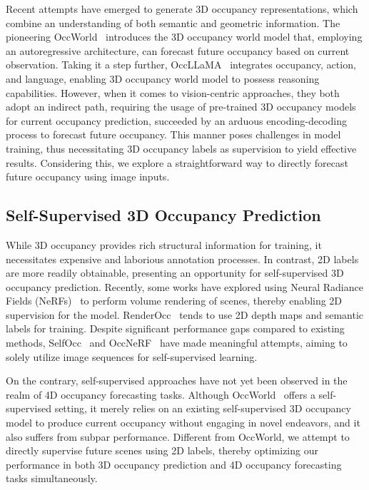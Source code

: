 Recent attempts have emerged to generate 3D occupancy representations, which combine an understanding of both semantic and geometric information. The pioneering OccWorld~\citep{zheng2023occworld} introduces the 3D occupancy world model that, employing an autoregressive architecture, can forecast future occupancy based on current observation. Taking it a step further, OccLLaMA~\citep{wei2024occllama} integrates occupancy, action, and language, enabling 3D occupancy world model to possess reasoning capabilities. However, when it comes to vision-centric approaches, they both adopt an indirect path, requiring the usage of pre-trained 3D occupancy models for current occupancy prediction, succeeded by an arduous encoding-decoding process to forecast future occupancy. This manner poses challenges in model training, thus necessitating 3D occupancy labels as supervision to yield effective results. Considering this, we explore a straightforward way to directly forecast future occupancy using image inputs.

\subsection{Self-Supervised 3D Occupancy Prediction}

While 3D occupancy provides rich structural information for training, it necessitates expensive and laborious annotation processes. In contrast, 2D labels are more readily obtainable, presenting an opportunity for self-supervised 3D occupancy prediction. Recently, some works have explored using Neural Radiance Fields (NeRFs)~\citep{mildenhall2021nerf} to perform volume rendering of scenes, thereby enabling 2D supervision for the model. RenderOcc~\citep{pan2024renderocc} tends to use 2D depth maps and semantic labels for training. Despite significant performance gaps compared to existing methods, SelfOcc~\citep{huang2024selfocc} and OccNeRF~\citep{zhang2023occnerf} have made meaningful attempts, aiming to solely utilize image sequences for self-supervised learning.

On the contrary, self-supervised approaches have not yet been observed in the realm of 4D occupancy forecasting tasks. Although OccWorld~\citep{zheng2023occworld} offers a self-supervised setting, it merely relies on an existing self-supervised 3D occupancy model to produce current occupancy without engaging in novel endeavors, and it also suffers from subpar performance. Different from OccWorld, we attempt to directly supervise future scenes using 2D labels, thereby optimizing our performance in both 3D occupancy prediction and 4D occupancy forecasting tasks simultaneously.